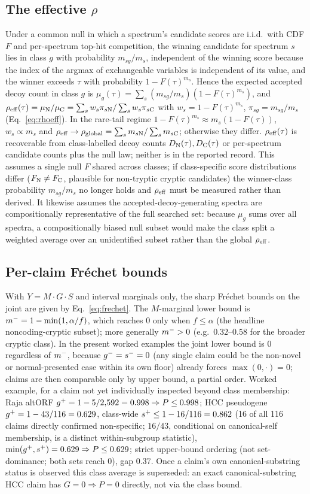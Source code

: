 \subsection{The effective \texorpdfstring{$\rho$}{rho}}
Under a common null in which a spectrum's candidate scores are i.i.d.\ with CDF $F$ and per-spectrum top-hit competition, the winning candidate for spectrum $s$ lies in class $g$ with probability $m_{sg}/m_s$, independent of the winning score because the index of the argmax of exchangeable variables is independent of its value, and the winner exceeds $\tau$ with probability $1-F(\tau)^{m_s}$. Hence the expected accepted decoy count in class $g$ is $\mu_g(\tau)=\sum_s (m_{sg}/m_s)(1-F(\tau)^{m_s})$, and $\rho_{\mathrm{eff}}(\tau)=\mu_{\mathrm{N}}/\mu_{\mathrm{C}}=\sum_s w_s\pi_{s\mathrm{N}} / \sum_s w_s\pi_{s\mathrm{C}}$ with $w_s=1-F(\tau)^{m_s}$, $\pi_{sg}=m_{sg}/m_s$ (Eq.~\ref{eq:rhoeff}). In the rare-tail regime $1-F(\tau)^{m_s}\approx m_s(1-F(\tau))$, $w_s\propto m_s$ and $\rho_{\mathrm{eff}}\to\rho_{\mathrm{global}}=\sum_s m_{s\mathrm{N}}/\sum_s m_{s\mathrm{C}}$; otherwise they differ. $\rho_{\mathrm{eff}}(\tau)$ is recoverable from class-labelled decoy counts $D_{\mathrm{N}}(\tau),D_{\mathrm{C}}(\tau)$ or per-spectrum candidate counts plus the null law; neither is in the reported record. This assumes a single null $F$ shared across classes; if class-specific score distributions differ ($F_{\mathrm{N}}\ne F_{\mathrm{C}}$, plausible for non-tryptic cryptic candidates) the winner-class probability $m_{sg}/m_s$ no longer holds and $\rho_{\mathrm{eff}}$ must be measured rather than derived. It likewise assumes the accepted-decoy-generating spectra are compositionally representative of the full searched set: because $\mu_g$ sums over all spectra, a compositionally biased null subset would make the class split a weighted average over an unidentified subset rather than the global $\rho_{\mathrm{eff}}$.

\subsection{Per-claim Fr\'echet bounds}
With $Y=M\cdot G\cdot S$ and interval marginals only, the sharp Fr\'echet bounds on the joint are given by Eq.~\ref{eq:frechet}. The $M$-marginal lower bound is $m^{-}=1-\min(1,\alpha/f)$, which reaches $0$ only when $f\le\alpha$ (the headline noncoding-cryptic subset); more generally $m^{-}>0$ (e.g.\ $0.32$--$0.58$ for the broader cryptic class). In the present worked examples the joint lower bound is $0$ regardless of $m^{-}$, because $g^{-}=s^{-}=0$ (any single claim could be the non-novel or normal-presented case within its own floor) already forces $\max(0,\cdot)=0$; claims are then comparable only by upper bound, a partial order. Worked example, for a claim not yet individually inspected beyond class membership: Raja altORF $g^{+}=1-5/2{,}592=0.998\Rightarrow P\le 0.998$; HCC pseudogene $g^{+}=1-43/116=0.629$, class-wide $s^{+}\le 1-16/116=0.862$ (16 of all 116 claims directly confirmed non-specific; $16/43$, conditional on canonical-self membership, is a distinct within-subgroup statistic), $\min(g^{+},s^{+})=0.629\Rightarrow P\le 0.629$; strict upper-bound ordering (not set-dominance; both sets reach $0$), gap 0.37. Once a claim's own canonical-substring status is observed this class average is superseded: an exact canonical-substring HCC claim has $G=0\Rightarrow P=0$ directly, not via the class bound.

